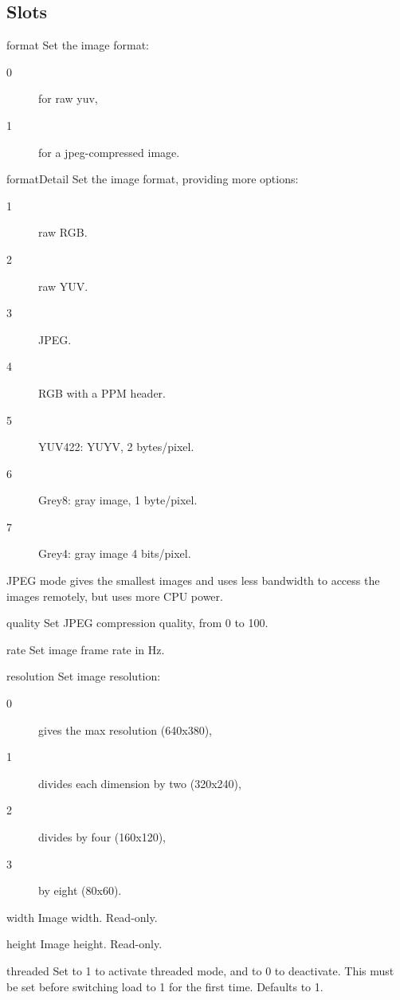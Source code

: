 \subsection{Slots}
\begin{urbiscriptapi}
\item[format] Set the image format:
  \begin{sublist}
    \begin{description}
    \item[0] for raw yuv,
    \item[1] for a jpeg-compressed image.
    \end{description}
  \end{sublist}
\item[formatDetail] Set the image format, providing more options:
  \begin{sublist}
    \begin{description}
    \item[1] raw RGB.
    \item[2] raw YUV.
    \item[3] JPEG.
    \item[4] RGB with a PPM header.
    \item[5] YUV422: YUYV, 2 bytes/pixel.
    \item[6] Grey8: gray image, 1 byte/pixel.
    \item[7] Grey4: gray image 4 bits/pixel.
    \end{description}
  \end{sublist}
  JPEG mode gives the smallest images and uses less bandwidth to access the
  images remotely, but uses more CPU power.
\item[quality] Set JPEG compression quality, from 0 to 100.
\item[rate] Set image frame rate in Hz.
\item[resolution] Set image resolution:
  \begin{sublist}
    \begin{description}
    \item[0] gives the max resolution (640x380),
    \item[1] divides each dimension by two (320x240),
    \item[2] divides by four (160x120),
    \item[3] by eight (80x60).
    \end{description}
  \end{sublist}

\item[width] Image width. Read-only.
\item[height] Image height. Read-only.
\item[threaded] Set to 1 to activate threaded mode, and to 0 to
  deactivate. This must be set before switching load to 1 for the first
  time. Defaults to 1.
\end{urbiscriptapi}

